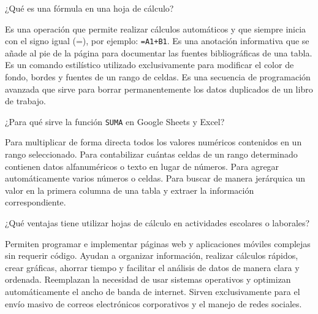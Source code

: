 \documentclass[12pt]{evaluasep}
\begin{document}
\begin{questions}
\begin{choices}
    \end{choices}
    
    \question ¿Qué es una fórmula en una hoja de cálculo?
    
    \begin{choices}
        \CorrectChoice Es una operación que permite realizar cálculos automáticos y que siempre inicia con el signo igual (=), por ejemplo: \texttt{=A1+B1}.
        \choice Es una anotación informativa que se añade al pie de la página para documentar las fuentes bibliográficas de una tabla.
        \choice Es un comando estilístico utilizado exclusivamente para modificar el color de fondo, bordes y fuentes de un rango de celdas.
        \choice Es una secuencia de programación avanzada que sirve para borrar permanentemente los datos duplicados de un libro de trabajo.
    
    \end{choices}
    

    \question ¿Para qué sirve la función \texttt{SUMA} en Google Sheets y Excel?
    
    \begin{choices}
        \choice Para multiplicar de forma directa todos los valores numéricos contenidos en un rango seleccionado.
        \choice Para contabilizar cuántas celdas de un rango determinado contienen datos alfanuméricos o texto en lugar de números.
        \CorrectChoice Para agregar automáticamente varios números o celdas.
        \choice Para buscar de manera jerárquica un valor en la primera columna de una tabla y extraer la información correspondiente.
    
    \end{choices}
    
        \newpage


    \question ¿Qué ventajas tiene utilizar hojas de cálculo en actividades escolares o laborales?
    
    \begin{choices}
        \choice Permiten programar e implementar páginas web y aplicaciones móviles complejas sin requerir código.
        \CorrectChoice Ayudan a organizar información, realizar cálculos rápidos, crear gráficas, ahorrar tiempo y facilitar el análisis de datos de manera clara y ordenada.
        \choice Reemplazan la necesidad de usar sistemas operativos y optimizan automáticamente el ancho de banda de internet.
        \choice Sirven exclusivamente para el envío masivo de correos electrónicos corporativos y el manejo de redes sociales.
    

\end{choices}
\end{questions}
\end{document}
